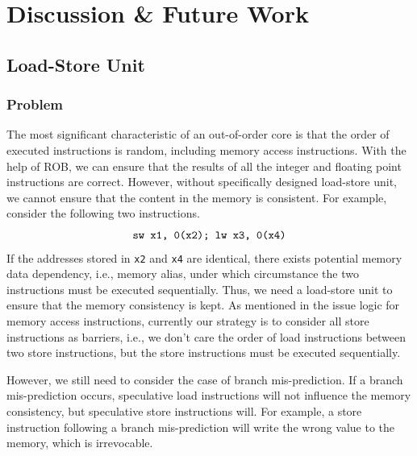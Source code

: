 
\let\clearpage\relax

\chapter{Discussion \& Future Work} %

\section{Load-Store Unit}
\subsection{Problem}
The most significant characteristic of an out-of-order core is that the order of executed instructions is random, including memory access instructions. With the help of ROB, we can ensure that the results of all the integer and floating point instructions are correct. However, without specifically designed load-store unit, we cannot ensure that the content in the memory is consistent. For example, consider the following two instructions.
\begin{equation*}
    \centering
    \texttt{sw x1, 0(x2); lw x3, 0(x4)}
\end{equation*}
If the addresses stored in \texttt{x2} and \texttt{x4} are identical, there exists potential memory data dependency, i.e., memory alias, under which circumstance the two instructions must be executed sequentially. Thus, we need a load-store unit to ensure that the memory consistency is kept. As mentioned in the issue logic for memory access instructions, currently our strategy is to consider all store instructions as barriers, i.e., we don't care the order of load instructions between two store instructions, but the store instructions must be executed sequentially.

However, we still need to consider the case of branch mis-prediction. If a branch mis-prediction occurs, speculative load instructions will not influence the memory consistency, but speculative store instructions will. For example, a store instruction following a branch mis-prediction will write the wrong value to the memory, which is irrevocable.

